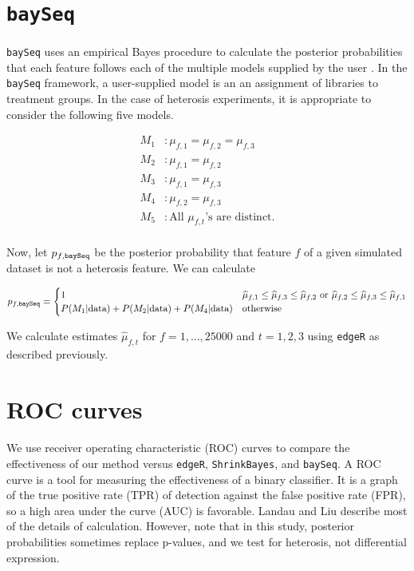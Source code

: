 \documentclass{article}
\providecommand{\wh}[1]{\widehat{#1}}
\begin{document}
\begin{flushleft}
\section{{\tt baySeq}}

\paragraph{} {\tt baySeq} uses an empirical Bayes procedure to calculate the posterior probabilities that each feature follows each of the multiple models supplied by the user \cite{baySeq}. In the {\tt baySeq} framework, a user-supplied model is an an assignment of libraries to treatment groups. In the case of heterosis experiments, it is appropriate to consider the following five models.

\begin{align*}
M_1&: \mu_{f, 1} = \mu_{f, 2} = \mu_{f, 3} \\
M_2&: \mu_{f, 1} = \mu_{f, 2} \\
M_3&: \mu_{f, 1} = \mu_{f, 3} \\
M_4&: \mu_{f, 2} = \mu_{f, 3} \\
M_5&: \text{All } \mu_{f, t}\text{'s are distinct.} \\
\end{align*}

Now, let $p_{f, {\tt baySeq}}$ be the posterior probability that feature $f$ of a given simulated dataset is not a heterosis feature. We can calculate

\begin{align*}
p_{f, {\tt baySeq}} = \begin{cases}
1 & \wh{\mu}_{f, 1} \le \wh{\mu}_{f, 3} \le \wh{\mu}_{f, 2} \text{ or } \wh{\mu}_{f, 2} \le \wh{\mu}_{f, 3} \le \wh{\mu}_{f, 1} \\
P(M_1 | \text{data}) + P(M_2 | \text{data}) + P(M_4 | \text{data}) & \text{otherwise}
\end{cases}
\end{align*}

We calculate estimates $\wh{\mu}_{f, t}$ for $f = 1, \ldots, 25000$ and $t = 1, 2, 3$ using {\tt edgeR} as described previously.

\section{ROC curves}

\paragraph{} We use receiver operating characteristic (ROC) curves to compare the effectiveness of our method versus {\tt edgeR}, {\tt ShrinkBayes}, and {\tt baySeq}. A ROC curve is a tool for measuring the effectiveness of a binary classifier. It is a graph of the true positive rate (TPR) of detection against the false positive rate (FPR), so a high area under the curve (AUC) is favorable. Landau and Liu \cite{LandauLiu} describe most of the details of calculation. However, note that in this study, posterior probabilities sometimes replace p-values, and we test for heterosis, not differential expression.

\end{flushleft}



\end{document}
